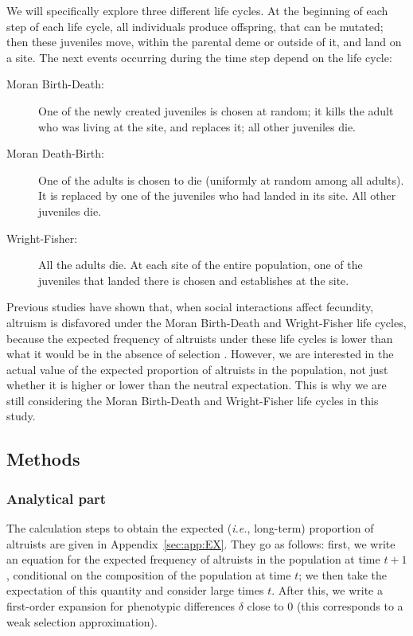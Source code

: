 \documentclass[11pt, letterpaper]{article}
\newcommand{\ie}{\textit{i.e.}}
\newcommand{\eg}{\textit{e.g.}}
\newcommand{\appname}[0]{Appendix}
\newcommand{\selstr}{\delta}
\begin{document}
We will specifically explore three different life cycles. At the beginning of each step of each life cycle, all individuals produce offspring, that can be mutated; then these juveniles move, within the parental deme or outside of it, and land on a site. The next events occurring during the time step depend on the life cycle:
\begin{description}
\item[Moran Birth-Death:] One of the newly created juveniles is chosen at random; it kills the adult who was living at the site, and replaces it; all other juveniles die. 
\item[Moran Death-Birth:] One of the adults is chosen to die (uniformly at random among all adults). It is replaced by one of the juveniles who had landed in its site. All other juveniles die. 
\item[Wright-Fisher:] All the adults die. At each site of the entire population, one of the juveniles that landed there is chosen and establishes at the site. 
\end{description}
%
Previous studies have shown that, when social interactions affect fecundity, altruism is disfavored under the Moran Birth-Death and Wright-Fisher life cycles, because the expected frequency of altruists under these life cycles is lower than what it would be in the absence of selection \citep[\eg,][]{Taylor1992islandmodel, Taylor2010, Taylor2011, Debarre2017}. However, we are interested in the actual value of the expected proportion of altruists in the population, not just whether it is higher or lower than the neutral expectation. This is why we are still considering the Moran Birth-Death and Wright-Fisher life cycles in this study. 
  
\subsection*{Methods}
\subsubsection*{Analytical part}

The calculation steps to obtain the expected (\ie, long-term) proportion of altruists are given in \appname~\ref{sec:app:EX}. They go as follows: first, we write an equation for the expected frequency of altruists in the population at time $t+1$, conditional on the composition of the population at time $t$; we then take the expectation of this quantity and consider large times $t$. After this, we write a first-order expansion for phenotypic differences $\selstr$ close to $0$ (this corresponds to a weak selection approximation). 
\end{document}
